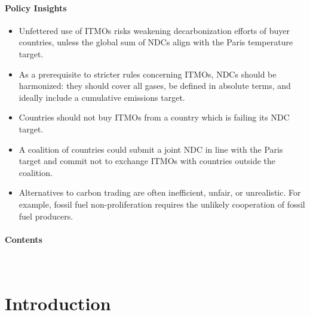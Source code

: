 \documentclass[12pt,english]{article}
\makeatletter
\renewcommand\tableofcontents{%
    \@starttoc{toc}%
}
\makeatother
\begin{document}
\paragraph{Policy Insights} %
\begin{itemize}
  \item Unfettered use of ITMOs risks weakening decarbonization efforts of buyer countries, unless the global sum of NDCs align with the Paris temperature target.
  \item As a prerequisite to stricter rules concerning ITMOs, NDCs should be harmonized: they should cover all gases, be defined in absolute terms, and ideally include a cumulative emissions target.
  \item Countries should not buy ITMOs from a country which is failing its NDC target.
  \item A coalition of countries could submit a joint NDC in line with the Paris target and commit not to exchange ITMOs with countries outside the coalition.
  \item Alternatives to carbon trading are often inefficient, unfair, or unrealistic. For example, fossil fuel non-proliferation requires the unlikely cooperation of fossil fuel producers.
\end{itemize}
\clearpage

\paragraph{Contents} \quad \\  %

\tableofcontents


\clearpage



\section*{Introduction}
\end{document}
